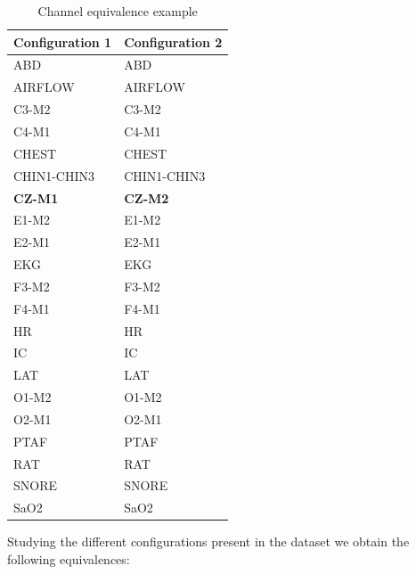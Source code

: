 \begin{table}[H]
\begin{center}
\begin{tabular}{ |p{3cm}||p{3cm}| }
 \hline
 Configuration 1 & Configuration 2 \\
 \hline
 ABD & ABD \\ 
 AIRFLOW & AIRFLOW \\  
 C3-M2 & C3-M2 \\
 C4-M1 & C4-M1 \\
 CHEST & CHEST \\
 CHIN1-CHIN3 & CHIN1-CHIN3 \\
 \textbf{CZ-M1} & \textbf{CZ-M2} \\
 E1-M2 & E1-M2 \\
 E2-M1 & E2-M1 \\
 EKG & EKG \\
 F3-M2 & F3-M2 \\
 F4-M1 & F4-M1 \\
 HR & HR \\
 IC & IC \\
 LAT & LAT \\
 O1-M2 & O1-M2 \\
 O2-M1 & O2-M1 \\
 PTAF & PTAF \\
 RAT & RAT \\
 SNORE & SNORE \\
 SaO2 & SaO2 \\ 
 \hline
\end{tabular}
\end{center}
\caption{Channel equivalence example}
\label{tab1}
\end{table}


Studying the different configurations present in the dataset we obtain the following equivalences:

